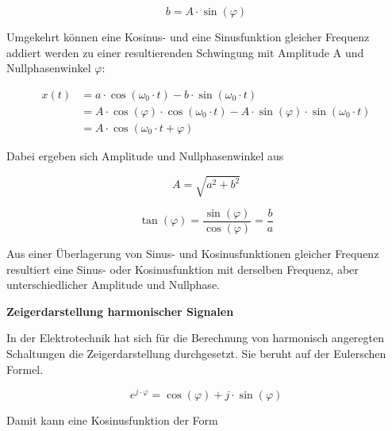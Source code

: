 \begin{equation}\label{eq:oneseventyeight}
b=A\cdot \sin \left(\varphi \right)
\end{equation}

\noindent Umgekehrt k\"{o}nnen eine Kosinus- und eine Sinusfunktion gleicher Frequenz addiert werden zu einer resultierenden Schwingung mit Amplitude A und Nullphasenwinkel $\varphi$:

\begin{equation}\label{eq:oneseventynine}
\begin{split}
x\left(t\right) & = a\cdot \cos \left(\omega _{0} \cdot t\right)-b\cdot \sin \left(\omega _{0} \cdot t\right) \\ 
& = A\cdot \cos \left(\varphi \right)\cdot \cos \left(\omega _{0} \cdot t\right)-A\cdot \sin \left(\varphi \right)\cdot \sin \left(\omega _{0} \cdot t\right) \\ 
& = A\cdot \cos \left(\omega _{0} \cdot t+\varphi \right)    
\end{split}
\end{equation}


\noindent Dabei ergeben sich Amplitude und Nullphasenwinkel aus 

\begin{equation}\label{eq:oneeighty}
A=\sqrt{a^{2} +b^{2} } 
\end{equation}

\begin{equation}\label{eq:oneeightyone}
\tan \left(\varphi \right)=\dfrac{\sin \left(\varphi \right)}{\cos \left(\varphi \right)} =\dfrac{b}{a} 
\end{equation}

\noindent Aus einer \"{U}berlagerung von Sinus- und Kosinusfunktionen gleicher Frequenz resultiert eine Sinus- oder Kosinusfunktion mit derselben Frequenz, aber unterschiedlicher Amplitude und Nullphase.\bigskip

{\selectfont
\noindent\textbf{Zeigerdarstellung harmonischer Signalen}} \smallskip

\noindent In der Elektrotechnik hat sich f\"{u}r die Berechnung von harmonisch angeregten Schaltungen die Zeigerdarstellung durchgesetzt. Sie beruht auf der Eulerschen Formel.

\begin{equation}\label{eq:oneeightytwo}
e^{j\cdot \varphi } =\cos \left(\varphi \right)+j\cdot \sin \left(\varphi \right)
\end{equation}


\noindent Damit kann eine Kosinusfunktion der Form


